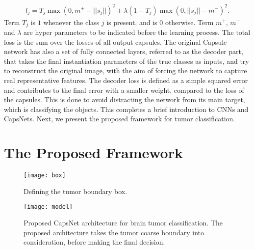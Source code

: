 \documentclass{article}
\begin{document}
%
\begin{eqnarray}
\label{eq:margin}
l_j=T_j \max(0,m^+\!\!\!-\!||s_j||)^2\!\!\!+\!\lambda(1\!-\!T_j) \max(0,||s_j||\!\!-\!m^-)^2.
\end{eqnarray}
%
Term $T_j$ is $1$ whenever the class $j$ is present, and is $0$ otherwise. Term $m^+$, $m^-$ and $\lambda$ are hyper parameters to be indicated before the learning process. The total loss is the sum over the losses of all output capsules. The original Capsule network has also a set of fully connected layers, referred to as the decoder part, that takes the final instantiation parameters of the true classes as inputs, and try to reconstruct the original image, with the aim of forcing the network to capture real representative features. The decoder loss is defined as a simple squared error and contributes to the final error with a smaller weight, compared to the loss of the capsules.  This is done to avoid distracting the network from its main target, which is classifying the objects. This completes a brief introduction to CNNs and CapsNets. Next, we present the proposed framework for  tumor classification.

\section{The Proposed Framework}\label{sec:WTE}
\begin{figure}[t!]
    \centering
    \texttt{[image: box]}
    \caption{\footnotesize Defining the tumor boundary box.}
    \label{fig:box}
\end{figure}
\begin{figure*}[t!]
\centering
\texttt{[image: model]}
\caption{\footnotesize Proposed CapsNet architecture for brain tumor classification. The proposed architecture takes the tumor coarse boundary into consideration, before making the final decision. \label{fig:model}}
\vspace{-.28in}
\end{figure*}
\end{document}
